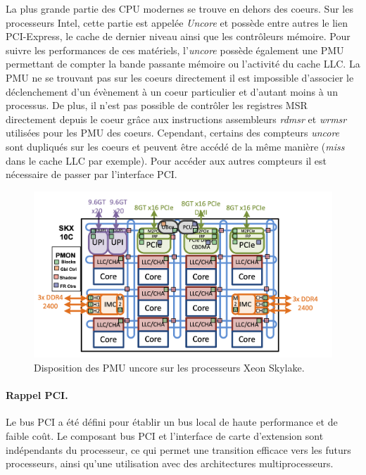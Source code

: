     
    La plus grande partie des CPU modernes se trouve en dehors des coeurs. Sur les processeurs Intel, cette partie est appelée \textit{Uncore} et possède entre autres le lien PCI-Express, le cache de dernier niveau ainsi que les contrôleurs mémoire. Pour suivre les performances de ces matériels, l'\textit{uncore} possède également une PMU permettant de compter la bande passante mémoire ou l'activité du cache LLC. La PMU ne se trouvant pas sur les coeurs directement il est impossible d'associer le déclenchement d'un évènement à un coeur particulier et d'autant moins à un processus. De plus, il n'est pas possible de contrôler les registres MSR directement depuis le coeur grâce aux instructions assembleurs \textit{rdmsr} et \textit{wrmsr} utilisées pour les PMU des coeurs. Cependant, certains des compteurs \textit{uncore} sont dupliqués sur les coeurs et peuvent être accédé de la même manière (\textit{miss} dans le cache LLC par exemple). Pour accéder aux autres compteurs il est nécessaire de passer par l'interface PCI.
    
     
    \begin{figure}
    \center
    \includegraphics[width=12cm]{images/edl_perf_uncore_intel_skl.png}
    \caption{\label{fig:edl_perf_uncore_intel_skl} Disposition des PMU uncore sur les processeurs Xeon Skylake. \protect\footnotemark}
    \end{figure}



    
    
    \paragraph{Rappel PCI.} 
    Le bus PCI a été défini pour établir un bus local de haute performance et de faible coût. Le composant bus PCI et l'interface de carte d'extension sont indépendants du processeur, ce qui permet une transition efficace vers les futurs processeurs, ainsi qu'une utilisation avec des architectures multiprocesseurs. 
    
